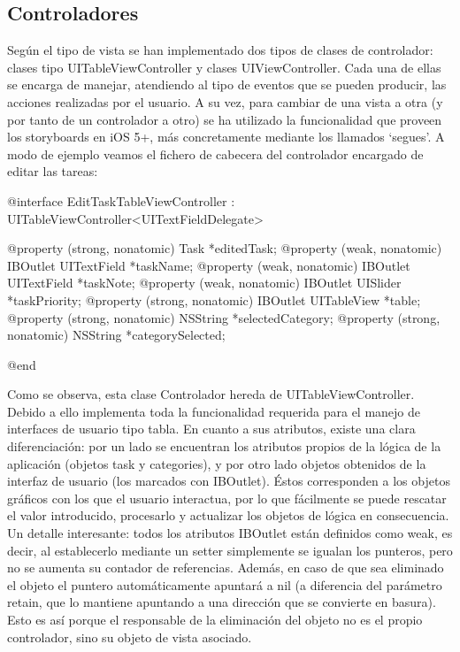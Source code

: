 \documentclass[parskip=half*]{scrartcl}
\begin{document}
\subsection{Controladores}

Seg\'un el tipo de vista se han implementado dos tipos de clases de controlador: clases tipo UITableViewController y clases UIViewController. Cada una de ellas se encarga de manejar, atendiendo al tipo de eventos que se pueden producir, las acciones realizadas por el usuario. A su vez, para cambiar de una vista a otra (y por tanto de un controlador a otro) se ha utilizado la funcionalidad que proveen los storyboards en iOS 5+, m\'as concretamente mediante los llamados `segues'.
A modo de ejemplo veamos el fichero de cabecera del controlador encargado de editar las tareas:

\begin{verbatimtab}
@interface EditTaskTableViewController : UITableViewController<UITextFieldDelegate>

@property (strong, nonatomic) Task *editedTask;
@property (weak, nonatomic) IBOutlet UITextField *taskName;
@property (weak, nonatomic) IBOutlet UITextField *taskNote;
@property (weak, nonatomic) IBOutlet UISlider *taskPriority;
@property (strong, nonatomic) IBOutlet UITableView *table;
@property (strong, nonatomic) NSString *selectedCategory;
@property (strong, nonatomic) NSString *categorySelected;

@end
\end{verbatimtab}

Como se observa, esta clase Controlador hereda de UITableViewController. Debido a ello implementa toda la funcionalidad requerida para el manejo de interfaces de usuario tipo tabla. En cuanto a sus atributos, existe una clara diferenciaci\'on: por un lado se encuentran los atributos propios de la l\'ogica de la aplicaci\'on (objetos task y categories), y por otro lado objetos obtenidos de la interfaz de usuario (los marcados con IBOutlet). Éstos corresponden a los objetos gr\'aficos con los que el usuario interactua, por lo que f\'acilmente se puede rescatar el valor introducido, procesarlo y actualizar los objetos de l\'ogica en consecuencia. Un detalle interesante: todos los atributos IBOutlet est\'an definidos como weak, es decir, al establecerlo mediante un setter simplemente se igualan los punteros, pero no se aumenta su contador de referencias. Adem\'as, en caso de que sea eliminado el objeto el puntero autom\'aticamente apuntar\'a a nil (a diferencia del par\'ametro retain, que lo mantiene apuntando a una direcci\'on que se convierte en basura). Esto es as\'i porque el responsable de la eliminaci\'on del objeto no es el propio controlador, sino su objeto de vista asociado.
\end{document}
